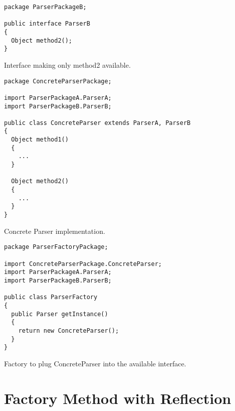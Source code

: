 \begin{listing}
\begin{verbatim}
package ParserPackageB;

public interface ParserB
{
  Object method2();
}
\end{verbatim}
\caption{Interface making only method2 available.} \label{lst:interface2}
\end{listing}

\begin{listing}
\begin{verbatim}
package ConcreteParserPackage;

import ParserPackageA.ParserA;
import ParserPackageB.ParserB;

public class ConcreteParser extends ParserA, ParserB
{
  Object method1()
  {
    ...
  }

  Object method2()
  {
    ...
  }
}
\end{verbatim}
\caption{Concrete Parser implementation.} \label{lst:interfaceconcrete}
\end{listing}

\begin{listing}
\begin{verbatim}
package ParserFactoryPackage;

import ConcreteParserPackage.ConcreteParser;
import ParserPackageA.ParserA;
import ParserPackageB.ParserB;

public class ParserFactory
{
  public Parser getInstance()
  {
    return new ConcreteParser();
  }
}
\end{verbatim}
\caption{Factory to plug ConcreteParser into the available interface.} \label{lst:interfacefactory}
\end{listing}


\section{Factory Method with Reflection}
\label{sc:reflection}


